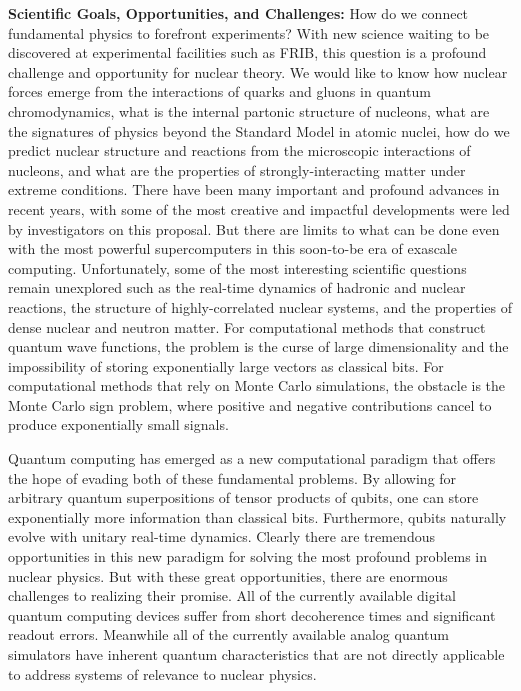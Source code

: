 \documentclass[10pt]{article}
\begin{document}
{\bf Scientific Goals, Opportunities, and Challenges:} 
How do we connect fundamental physics to forefront experiments?  With new science 
waiting to be discovered at experimental facilities such as FRIB, this question is a 
profound challenge and opportunity for nuclear theory.  We would like to know how nuclear forces emerge from the interactions of quarks and gluons in quantum chromodynamics, what is the internal partonic structure of nucleons, what are the signatures of physics beyond the Standard Model in atomic nuclei, how do we predict nuclear structure and reactions from the microscopic interactions of nucleons, and what are the properties of strongly-interacting matter under extreme conditions.  There have been many important and profound advances in recent years, with some of the most creative and impactful developments were led by investigators on this proposal.  But there are limits to what can be done even with the most powerful supercomputers in this soon-to-be era of exascale computing.  Unfortunately, some of the most interesting scientific questions remain unexplored such as the real-time dynamics of hadronic and nuclear reactions, the structure of highly-correlated nuclear systems, and the properties of dense nuclear and neutron matter. For computational methods that construct quantum wave functions, the problem is the curse of large dimensionality and the impossibility of storing exponentially large vectors as classical bits.  For computational methods that rely on Monte Carlo simulations, the obstacle is the Monte Carlo sign problem, where positive and negative contributions cancel to produce exponentially small signals.

Quantum computing has emerged as a new computational paradigm that offers the hope of evading both of these fundamental problems.  By allowing for arbitrary quantum superpositions of tensor products of qubits, one can store exponentially more information than classical bits.  Furthermore, qubits naturally evolve with unitary real-time dynamics. Clearly there are tremendous opportunities in this new paradigm for solving the most profound problems in nuclear physics.  But with these great opportunities, there are enormous challenges to realizing their promise.  All of the currently available digital quantum computing devices suffer from short decoherence times and significant readout errors.  Meanwhile all of the currently available analog quantum simulators have inherent quantum characteristics that are not directly applicable to address systems of relevance to nuclear physics.
\end{document}
